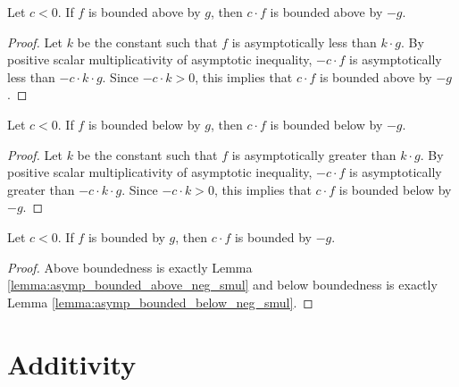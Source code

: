 \begin{lemma}
    \label{lemma:asymp_bounded_above_neg_smul}
    \leanok
    Let $c < 0$. If $f$ is bounded above by $g$, then $c \cdot f$ is bounded
    above by $-g$.
\end{lemma}

\begin{proof}
    \leanok
    Let $k$ be the constant such that $f$ is asymptotically less than $k \cdot g$.
    By positive scalar multiplicativity of asymptotic inequality, $-c \cdot f$ is 
    asymptotically less than $-c \cdot k \cdot g$. Since $-c \cdot k > 0$, this implies
    that $c \cdot f$ is bounded above by $-g$.
\end{proof}

\begin{lemma}
    \label{lemma:asymp_bounded_below_neg_smul}
    \leanok
    Let $c < 0$. If $f$ is bounded below by $g$, then $c \cdot f$ is bounded
    below by $-g$.
\end{lemma}

\begin{proof}
    \leanok
    Let $k$ be the constant such that $f$ is asymptotically greater than $k \cdot g$.
    By positive scalar multiplicativity of asymptotic inequality, $-c \cdot f$ is 
    asymptotically greater than $-c \cdot k \cdot g$. Since $-c \cdot k > 0$, this implies
    that $c \cdot f$ is bounded below by $-g$.
\end{proof}

\begin{lemma}
    \label{lemma:asymp_bounded_neg_smul}
    \leanok
    Let $c < 0$. If $f$ is bounded by $g$, then $c \cdot f$ is bounded by $-g$.
\end{lemma}

\begin{proof}
    \leanok
    Above boundedness is exactly Lemma \ref{lemma:asymp_bounded_above_neg_smul} and
    below boundedness is exactly Lemma \ref{lemma:asymp_bounded_below_neg_smul}.
\end{proof}


\section{Additivity}

